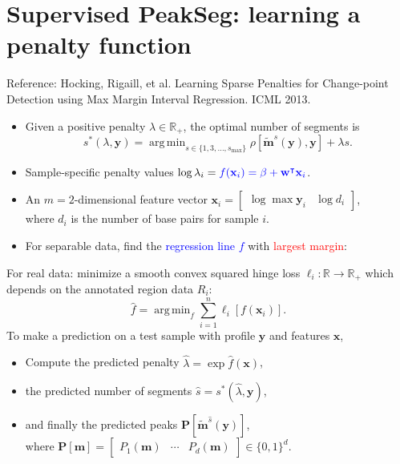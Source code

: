 \documentclass[legalpaper]{article}
\newcommand{\RR}{\mathbb R}
\DeclareMathOperator*{\argmin}{arg\,min}
\begin{document}
\newpage

\section*{Supervised PeakSeg: learning a penalty function}
Reference: Hocking, Rigaill, et al. Learning Sparse Penalties for
Change-point Detection using Max Margin Interval Regression. ICML
2013.

\begin{itemize}
\item Given a positive penalty $\lambda\in\RR_+$, the optimal number
  of segments is
\begin{equation*} s^*(\lambda, \mathbf y) =
    \argmin_{s\in\{1,3,\dots, s_{\text{max}}\}} \rho\left[
      \mathbf{\tilde m}^s(\mathbf y), \mathbf y \right] + \lambda s.
\end{equation*}
\item Sample-specific penalty values $\log \lambda_i = 
\textcolor{blue}{
  f(\mathbf x_i)
  = \beta + \mathbf w^\intercal \mathbf x_i
}$.
\item An $m=2$-dimensional feature vector
$\mathbf x_i = \left[\begin{array}{cc} \log\max \mathbf y_i & \log d_i
\end{array}\right]$,\\ where $d_i$ is the number of base pairs for 
sample $i$.
\item For separable data, find the 
\textcolor{blue}{regression line $f$}
 with
\textcolor{red}{largest margin}:\\

\end{itemize}

\newpage

For real data: minimize a smooth convex squared hinge loss
$\ell_i:\RR\rightarrow\RR_+$ which depends on the annotated region
data $R_i$:
\begin{equation*}
  \label{eq:relax}
  \hat f = \argmin_f \sum_{i=1}^n
  \ell_i\left[ f(\mathbf x_i) \right].
\end{equation*}
To make a prediction on a
test sample with profile $\mathbf y$ and features $\mathbf x$,
\begin{itemize}
\item Compute the predicted penalty $\hat \lambda = \exp \hat f(\mathbf x)$,
\item the predicted number of segments $\hat s = s^*(\hat \lambda, \mathbf
y)$, 
\item and finally the predicted peaks $\mathbf P\left[ \mathbf{\tilde
    m}^{\hat s}(\mathbf y) \right]$,\\
where $\mathbf P[\mathbf m] = \left[\begin{array}{ccc}
    P_1(\mathbf m) & \cdots & P_d(\mathbf m)
\end{array}\right]\in\{0, 1\}^d$.
\end{itemize}
\end{document}
